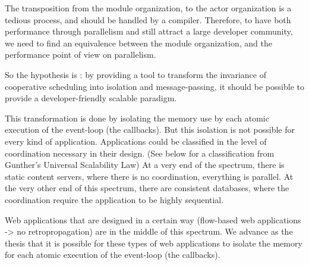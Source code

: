 








The transposition from the module organization, to the actor organization is a tedious process, and should be handled by a compiler.
Therefore, to have both performance through parallelism and still attract a large developer community, we need to find an equivalence between the module organization, and the performance point of view on parallelism.


So the hypothesis is : by providing a tool to transform the invariance of cooperative scheduling into isolation and message-passing, it should be possible to provide a developer-friendly scalable paradigm.

This transformation is done by isolating the memory use by each atomic execution of the event-loop (the callbacks).
But this isolation is not possible for every kind of application.
Applications could be classified in the level of coordination necessary in their design. (See below for a classification from Gunther's Universal Scalability Law)
At a very end of the spectrum, there is static content servers, where there is no coordination, everything is parallel.
At the very other end of this spectrum, there are consistent databases, where the coordination require the application to be highly sequential.

Web applications that are designed in a certain way (flow-based web applications -> no retropropagation) are in the middle of this spectrum.
We advance as the thesis that it is possible for these types of web applications to isolate the memory for each atomic execution of the event-loop (the callbacks).



